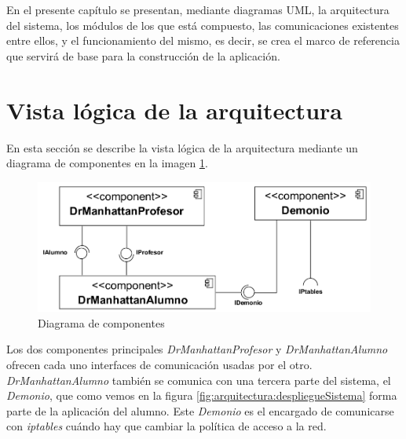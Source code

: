 

\label{chap:arquitectura}

En el presente capítulo se presentan, mediante diagramas UML\cite{UML:2004, UML2:2004}, la arquitectura del sistema\cite{ARQ:2010}, los módulos de los que está compuesto, las comunicaciones existentes entre ellos, y el funcionamiento del mismo, es decir, se crea el marco de referencia que servirá de base para la construcción de la aplicación.

\chaptertoc

\section{Vista lógica de la arquitectura}
\label{sec:arquitectura:arqLogica}

En esta sección se describe la vista lógica de la arquitectura mediante un diagrama de componentes en la imagen \ref{fig:arquitectura:componentes}.
\newline


\begin{figure}
    \centering
    \includegraphics[width=\linewidth]{arquitectura/componentes}
    \caption{Diagrama de componentes}
    \label{fig:arquitectura:componentes}
\end{figure}


Los dos componentes principales \emph{DrManhattanProfesor} y \emph{DrManhattanAlumno} ofrecen cada uno interfaces de comunicación usadas por el otro. \emph{DrManhattanAlumno} también se comunica con una tercera parte del sistema, el \emph{Demonio}, que como vemos en la figura \ref{fig:arquitectura:despliegueSistema} forma parte de la aplicación del alumno. Este \emph{Demonio} es el encargado de comunicarse con \emph{iptables} cuándo hay que cambiar la política de acceso a la red.
\newline

